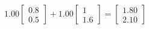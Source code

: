 \documentclass[preview]{standalone}
\begin{document}
\begin{align*}
1.00 \begin{bmatrix} 0.8 \\ 0.5 \end{bmatrix} + 1.00 \begin{bmatrix} 1 \\ 1.6 \end{bmatrix} = \begin{bmatrix} 1.80 \\ 2.10 \end{bmatrix}
\end{align*}
\end{document}
